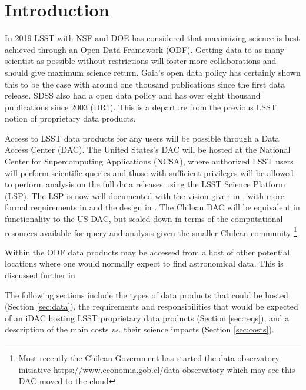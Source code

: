 \section{Introduction}\label{sec:intro}


In 2019 LSST with NSF and DOE has considered that maximizing science is best achieved through an Open Data Framework (ODF).
Getting data to as many scientist as possible without restrictions will foster more collaborations and should give maximum science return. Gaia's \citep{2016A&A...595A...1G} open data policy has certainly shown this to be the case with around one thousand publications since the first data release. SDSS also had a open data policy and has over eight thousand publications since 2003 (DR1).
This is a departure from the previous LSST notion of proprietary data products.


 Access to LSST data products for any users will be possible through a Data Access Center (DAC). The United States's DAC will be hosted at the National Center for Supercomputing Applications (NCSA),
where authorized LSST users will perform scientific queries and those with sufficient privileges will be allowed to perform analysis on the full data releases using the LSST Science Platform (LSP). The LSP is now well documented with the vision given in , with more formal requirements in  and the design in . The Chilean DAC will be equivalent in functionality to the US DAC, but scaled-down in terms of the computational resources available for query and analysis given the smaller Chilean community \footnote{Most recently the Chilean Government has started the data observatory initiative \url{https://www.economia.gob.cl/data-observatory} which may see this DAC moved to the cloud}.

Within the ODF data products may be accessed from a host of other potential locations where one would normally expect to find astronomical data. This is discussed further in 


The following sections include the types of data products that could be hosted (Section \ref{sec:data}), the requirements and responsibilities that would be expected of an iDAC hosting LSST proprietary data products (Section \ref{sec:reqs}), and a description of the main costs {\it vs.} their science impacts (Section \ref{sec:costs}).

